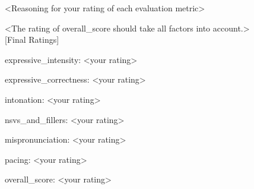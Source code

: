 \begin{tcolorbox}[gray_box, title = {{Prompt Template: GSRM Training \& Inference }}]
<Reasoning for your rating of each evaluation metric>

<The rating of overall_score should take all factors into account.> \\

[Final Ratings]

expressive_intensity: <your rating>

expressive_correctness: <your rating>

intonation: <your rating>

nsvs_and_fillers: <your rating>

mispronunciation: <your rating>

pacing: <your rating>

overall_score: <your rating>
\end{tcolorbox}